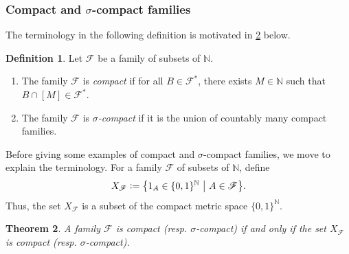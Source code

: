 \documentclass[letter,11pt]{article}
\theoremstyle{plain}
\newtheorem{theorem}{Theorem}
\theoremstyle{definition}
\newtheorem{definition}[theorem]{Definition}
\theoremstyle{plain}
\theoremstyle{plain}
\numberwithin{equation}{section}
\newcommand{\N}{\mathbb{N}}
\newcommand{\defeq}{\vcentcolon=}
\newcommand{\class}{\mathscr{F}}
\newcommand{\family}{\mathscr{F}}
\begin{document}
\subsubsection{Compact and \texorpdfstring{$\sigma$}{sigma}-compact families}
\label{sec:compact-sigma-compact-first}

The terminology in the following definition is motivated in \cref{prop:sigma-compact-equivalent} below.

\begin{definition}
\label{def:compact}
\label{def:uniformity}
Let $\family$ be a family of subsets of $\N$.
\begin{enumerate}
    \item The family $\family$ is \emph{compact} if for all $B \in \family^*$, there exists $M \in \N$ such that $B \cap [M] \in \family^*$.

    \item The family $\family$ is \emph{$\sigma$-compact} if it is the union of countably many compact families.
\end{enumerate}
\end{definition}

Before giving some examples of compact and $\sigma$-compact families, we move to explain the terminology.  For a family $\class$ of subsets of $\N$, define
\[X_{\class} \defeq \big\{1_A \in \{0, 1\}^{\N} \ \big| \ A \in \class\big\}.\]
Thus, the set $X_{\class}$ is a subset of the compact metric space $\{0, 1\}^{\N}$.



\begin{theorem}
\label{prop:sigma-compact-equivalent}
    A family $\family$ is compact (resp. $\sigma$-compact) if and only if the set $X_{\class}$ is compact (resp. $\sigma$-compact).
\end{theorem}
\end{document}
